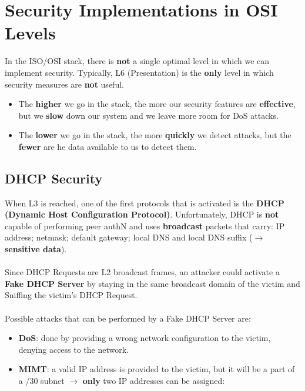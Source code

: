 \chapter{Security Implementations in OSI Levels}
\begin{quotebox-yellow}{}
    In the ISO/OSI stack, there is \textbf{not} a single optimal level in which we can implement security. Typically, L6 (Presentation) is the \textbf{only} level in which security measures are \textbf{not} useful.
\begin{itemize}
    \item The \textbf{higher} we go in the stack, the more our security features are \textbf{effective}, but we \textbf{slow}
    down our system and we leave more room for DoS attacks.
    \item The \textbf{lower} we go in the stack, the more \textbf{quickly} we detect attacks, but the \textbf{fewer} are he data available to us to detect them.
\end{itemize}
\end{quotebox-yellow}
\section{DHCP Security}
When L3 is reached, one of the first protocols that is activated is the \textbf{DHCP (Dynamic Host Configuration Protocol)}. Unfortunately, DHCP is \textbf{not} capable of performing peer authN
and uses \textbf{broadcast} packets that carry: IP address; netmask; default gateway; local DNS and local DNS suffix (\(\rightarrow \) \textbf{sensitive data}).\\   
\\    
Since DHCP Requests are L2 broadcast frames, an attacker could activate a \textbf{Fake DHCP
Server} by staying in the same broadcast domain of the victim and Sniffing the victim’s DHCP Request.\\    
\\    
Possible attacks that can be performed by a Fake DHCP Server are:
\begin{itemize}
    \item \textbf{DoS}: done by providing a wrong network configuration to the victim, denying access to the network.
    \item \textbf{MIMT}:  a valid IP address is provided to the victim, but it will be a part of a /30 subnet \(\rightarrow \) \textbf{only} two IP addresses can be assigned:
\end{itemize}